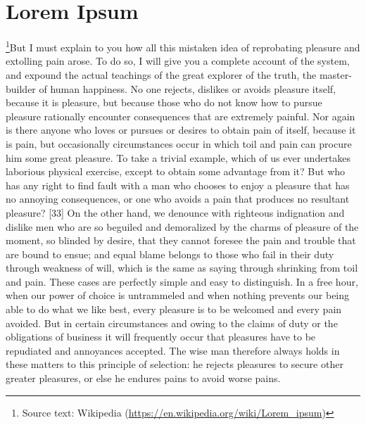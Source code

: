 \documentclass[twoside]{article} %
\begin{document}
	\section{Lorem Ipsum}
	\footnote{Source text: Wikipedia (\url{https://en.wikipedia.org/wiki/Lorem_ipsum})}But I must explain to you how all this mistaken idea of reprobating pleasure and extolling pain arose. To do so, I will give you a complete account of the system, and expound the actual teachings of the great explorer of the truth, the master-builder of human happiness.  No one rejects, dislikes or avoids pleasure itself, because it is pleasure, but because those who do not know how to pursue pleasure rationally encounter consequences that are extremely painful. Nor again is there anyone who loves or pursues or desires to obtain pain of itself, because it is pain, but occasionally circumstances occur in which toil and pain can procure him some great pleasure.   To take a trivial example, which of us ever undertakes laborious physical exercise, except to obtain some advantage from it? But who has any right to find fault with a man who chooses to enjoy a pleasure that has no annoying consequences, or one who avoids a pain that produces no resultant pleasure? [33] On the other hand, we denounce with righteous indignation and dislike men who are so beguiled and demoralized by the charms of pleasure of the moment, so blinded by desire, that they cannot foresee the pain and trouble that are bound to ensue; and equal blame belongs to those who fail in their duty through weakness of will, which is the same as saying through shrinking from toil and pain. These cases are perfectly simple and easy to distinguish. In a free hour, when our power of choice is untrammeled and when nothing prevents our being able to do what we like best, every pleasure is to be welcomed and every pain avoided. But in certain circumstances and owing to the claims of duty or the obligations of business it will frequently occur that pleasures have to be repudiated and annoyances accepted.  The wise man therefore always holds in these matters to this principle of selection: he rejects pleasures to secure other greater pleasures, or else he endures pains to avoid worse pains.
\end{document}
